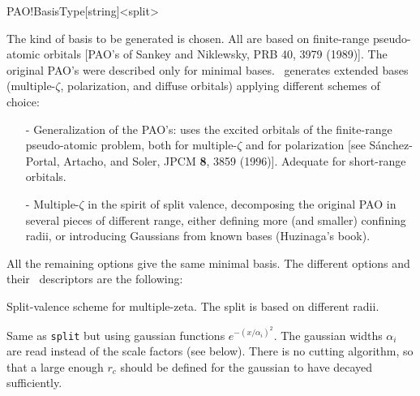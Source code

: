 \begin{fdfentry}{PAO!BasisType}[string]<split>
  
  The kind of basis to be generated is chosen. All are based on
  finite-range pseudo-atomic orbitals [PAO's of Sankey and Niklewsky, PRB 40, 3979
  (1989)]. The original PAO's were described only for minimal
  bases. \siesta\ generates extended bases
  (multiple-$\zeta$,
  polarization, and diffuse
  orbitals) applying different schemes of
  choice:

  \begin{itemize}

    \item[-] Generalization of the PAO's: uses the excited orbitals of
    the finite-range pseudo-atomic problem, both for multiple-$\zeta$
    and for polarization [see S\'anchez-Portal, Artacho, and Soler,
    JPCM \textbf{8}, 3859 (1996)]. Adequate for short-range orbitals.

    \item[-] Multiple-$\zeta$ in the spirit of split
    valence, decomposing the original PAO in
    several pieces of different range, either defining more (and
    smaller) confining radii, or introducing
    Gaussians from known bases (Huzinaga's book).

  \end{itemize}

  \noindent
  All the remaining options give the same minimal basis. The different options and their \fdflib\ descriptors are
  the following:

  \begin{fdfoptions}

    \option[split]%

    Split-valence scheme for multiple-zeta.
    The split is based on different radii.


    \option[splitgauss]%
    
    Same as \texttt{split} but using gaussian functions
    $e^{-(x/\alpha_i)^2}$. The gaussian widths $\alpha_i$ are read
    instead of the scale factors (see below). There is no cutting
    algorithm, so that a large enough $r_c$ should be defined for the
    gaussian to have decayed sufficiently.
    


\end{fdfoptions}
\end{fdfentry}
